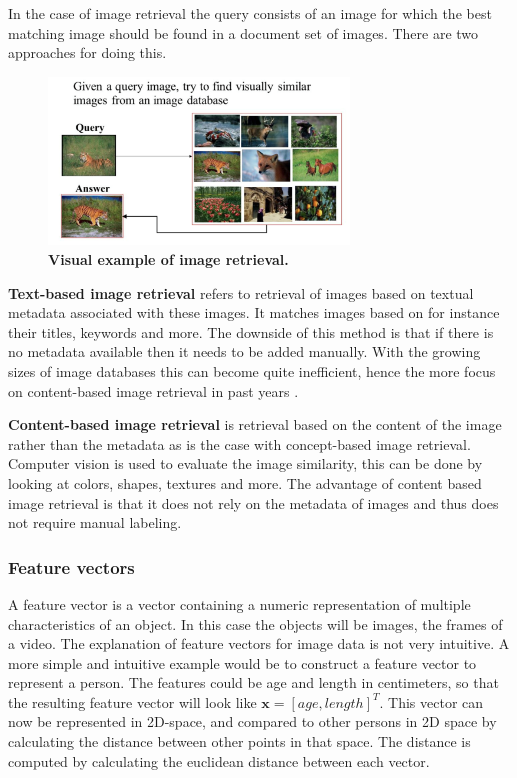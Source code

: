 \documentclass{article}
\begin{document}
In the case of image retrieval the query consists of an image for which the best matching image should be found in a document set of images. There are two approaches for doing this.

\begin{figure}[H]
	\includegraphics[width=8cm]{images/imageretrieval.png}
	\centering
	\caption{\textbf{Visual example of image retrieval.}}
	\label{fig:imageretrieval}
\end{figure}

\textbf{Text-based image retrieval} refers to retrieval of images based on textual metadata associated with these images. It matches images based on for instance their titles, keywords and more. The downside of this method is that if there is no metadata available then it needs to be added manually. With the growing sizes of image databases this can become quite inefficient, hence the more focus on content-based image retrieval in past years \cite{rajam2013survey}.

\textbf{Content-based image retrieval} is retrieval based on the content of the image rather than the metadata as is the case with concept-based image retrieval. Computer vision is used to evaluate the image similarity, this can be done by looking at colors, shapes, textures and more. The advantage of content based image retrieval is that it does not rely on the metadata of images and thus does not require manual labeling.

\subsubsection{Feature vectors}
A feature vector is a vector containing a numeric representation of multiple characteristics of an object. In this case the objects will be images, the frames of a video. The explanation of feature vectors for image data is not very intuitive. A more simple and intuitive example would be to construct a feature vector to represent a person. The features could be age and length in centimeters, so that the resulting feature vector will look like $\textbf{x} = [age, length]^T$. This vector can now be represented in 2D-space, and compared to other persons in 2D space by calculating the distance between other points in that space. The distance is computed by calculating the euclidean distance between each vector.
\end{document}
